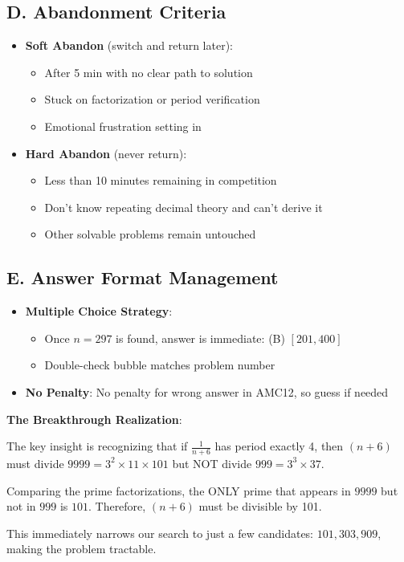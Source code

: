 \documentclass[11pt]{article}
\begin{document}
\begin{competitionbox}
\subsection*{D. Abandonment Criteria}
\begin{itemize}[leftmargin=*]
    \item \textbf{Soft Abandon} (switch and return later):
    \begin{itemize}
        \item After 5 min with no clear path to solution
        \item Stuck on factorization or period verification
        \item Emotional frustration setting in
    \end{itemize}
    
    \item \textbf{Hard Abandon} (never return):
    \begin{itemize}
        \item Less than 10 minutes remaining in competition
        \item Don't know repeating decimal theory and can't derive it
        \item Other solvable problems remain untouched
    \end{itemize}
\end{itemize}

\subsection*{E. Answer Format Management}
\begin{itemize}[leftmargin=*]
    \item \textbf{Multiple Choice Strategy}: 
    \begin{itemize}
        \item Once $n = 297$ is found, answer is immediate: (B) $[201, 400]$
        \item Double-check bubble matches problem number
    \end{itemize}
    \item \textbf{No Penalty}: No penalty for wrong answer in AMC12, so guess if needed
\end{itemize}
\end{competitionbox}

\begin{keyinsightbox}
\textbf{The Breakthrough Realization}: 

The key insight is recognizing that if $\frac{1}{n+6}$ has period exactly 4, then $(n+6)$ must divide $9999 = 3^2 \times 11 \times 101$ but NOT divide $999 = 3^3 \times 37$. 

Comparing the prime factorizations, the ONLY prime that appears in $9999$ but not in $999$ is $\boxed{101}$. Therefore, $(n+6)$ must be divisible by 101.

This immediately narrows our search to just a few candidates: $101, 303, 909$, making the problem tractable.
\end{keyinsightbox}
\end{document}
